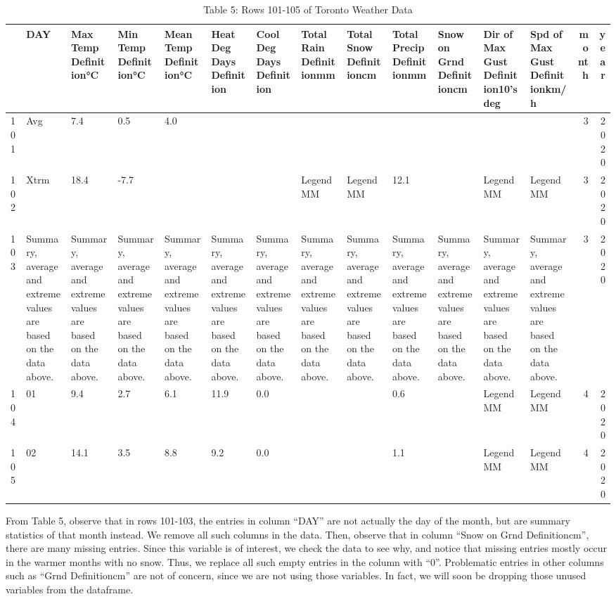 \documentclass[
]{article}
\begin{document}
\begin{table}[!h]

\caption{\label{tab:Table 5 Rows 101-105 of Toronto Weather Data}Table 5: Rows 101-105 of Toronto Weather Data}
\centering
\begin{tabular}[t]{l|l|l|l|l|l|l|l|l|l|l|l|l|r|r}
\hline
  & DAY & Max Temp Definition°C & Min Temp Definition°C & Mean Temp Definition°C & Heat Deg Days Definition & Cool Deg Days Definition & Total Rain Definitionmm & Total Snow Definitioncm & Total Precip Definitionmm & Snow on Grnd Definitioncm & Dir of Max Gust Definition10's deg & Spd of Max Gust Definitionkm/h & month & year\\
\hline
101 & Avg & 7.4 & 0.5 & 4.0 &  &  &  &  &  &  &  &  & 3 & 2020\\
\hline
102 & Xtrm & 18.4 & -7.7 &  &  &  & LegendMM & LegendMM & 12.1 &  & LegendMM & LegendMM & 3 & 2020\\
\hline
103 & Summary, average and extreme values are based on the data above. & Summary, average and extreme values are based on the data above. & Summary, average and extreme values are based on the data above. & Summary, average and extreme values are based on the data above. & Summary, average and extreme values are based on the data above. & Summary, average and extreme values are based on the data above. & Summary, average and extreme values are based on the data above. & Summary, average and extreme values are based on the data above. & Summary, average and extreme values are based on the data above. & Summary, average and extreme values are based on the data above. & Summary, average and extreme values are based on the data above. & Summary, average and extreme values are based on the data above. & 3 & 2020\\
\hline
104 & 01 & 9.4 & 2.7 & 6.1 & 11.9 & 0.0 &  &  & 0.6 &  & LegendMM & LegendMM & 4 & 2020\\
\hline
105 & 02 & 14.1 & 3.5 & 8.8 & 9.2 & 0.0 &  &  & 1.1 &  & LegendMM & LegendMM & 4 & 2020\\
\hline
\end{tabular}
\end{table}

From Table 5, observe that in rows 101-103, the entries in column
``DAY'' are not actually the day of the month, but are summary
statistics of that month instead. We remove all such columns in the
data. Then, observe that in column ``Snow on Grnd Definitioncm'', there
are many missing entries. Since this variable is of interest, we check
the data to see why, and notice that missing entries mostly occur in the
warmer months with no snow. Thus, we replace all such empty entries in
the column with ``0''. Problematic entries in other columns such as
``Grnd Definitioncm'' are not of concern, since we are not using those
variables. In fact, we will soon be dropping those unused variables from
the dataframe.
\end{document}
